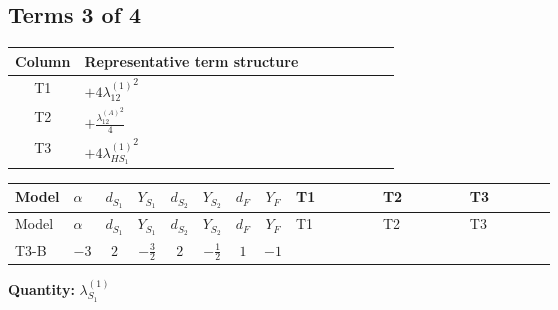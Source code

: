\documentclass[8pt]{article}
\begin{document}
\begin{landscape}
\subsection*{Terms 3 of 4}
\begin{center}
\begin{tabular}{@{}c >{\raggedright\arraybackslash}p{0.82\linewidth}@{}}
\toprule
Column & Representative term structure \\
\midrule
T1 & \(\displaystyle +4 {\lambda_{12}^{(1)}}^2\) \\
\midrule
T2 & \(\displaystyle +\frac{{\lambda_{12}^{(A)}}^2}{4}\) \\
\midrule
T3 & \(\displaystyle +4 {\lambda_{HS_1}^{(1)}}^2\) \\
\midrule
\bottomrule
\end{tabular}
\end{center}
\smallskip
\tiny
\begin{longtable}{@{}llcccccc >{\raggedright\arraybackslash}p{0.21\linewidth} >{\raggedright\arraybackslash}p{0.21\linewidth} >{\raggedright\arraybackslash}p{0.21\linewidth}@{}}
\toprule
Model & $\alpha$ & $d_{S_1}$ & $Y_{S_1}$ & $d_{S_2}$ & $Y_{S_2}$ & $d_F$ & $Y_F$ & T1 & T2 & T3 \\
\midrule
\endfirsthead
\toprule
Model & $\alpha$ & $d_{S_1}$ & $Y_{S_1}$ & $d_{S_2}$ & $Y_{S_2}$ & $d_F$ & $Y_F$ & T1 & T2 & T3 \\
\midrule
\endhead
T3-B & $-3$ & $2$ & $-\frac{3}{2}$ & $2$ & $-\frac{1}{2}$ & $1$ & $-1$ & \scriptsize\adjustbox{max width=\linewidth}{$\begin{gathered} +4 {\lambda_{12}^{(1)}}^2\end{gathered}$} & \scriptsize\adjustbox{max width=\linewidth}{$\begin{gathered} +\frac{{\lambda_{12}^{(A)}}^2}{4}\end{gathered}$} & \scriptsize\adjustbox{max width=\linewidth}{$\begin{gathered} +4 {\lambda_{HS_1}^{(1)}}^2\end{gathered}$} \\
\midrule
\bottomrule
\end{longtable}
\clearpage
\noindent\textbf{Quantity: }$\lambda_{S_1}^{(1)}$\par\smallskip

\end{landscape}
\end{document}
